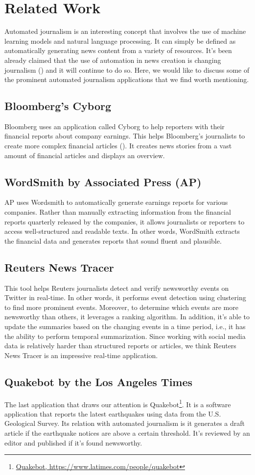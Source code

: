 \section{Related Work}\label{sec:related_work}
Automated journalism is an interesting concept that involves the use of machine learning models and natural language processing. It can simply be defined as automatically generating news content from a variety of resources. It's been already claimed that the use of automation in news creation is changing journalism (\cite{guzman2019prioritizing}) and it will continue to do so. Here, we would like to discuss some of the prominent automated journalism applications that we find worth mentioning.
\subsection{Bloomberg’s Cyborg}
Bloomberg uses an application called Cyborg to help reporters with their financial reports about company earnings. This helps Bloomberg's journalists to create more complex financial articles (\cite{micklethwait2018future}). It creates news stories from a vast amount of financial articles and displays an overview.
\subsection{WordSmith by Associated Press (AP)}
AP uses Wordsmith to automatically generate earnings reports for various companies. Rather than manually extracting information from the financial reports quarterly released by the companies, it allows journalists or reporters to access well-structured and readable texts. In other words, WordSmith extracts the financial data and generates reports that sound fluent and plausible.
\subsection{Reuters News Tracer}
This tool helps Reuters journalists detect and verify newsworthy events on Twitter in real-time. In other words, it performs event detection using clustering to find more prominent events. Moreover, to determine which events are more newsworthy than others, it leverages a ranking algorithm. In addition, it's able to update the summaries based on the changing events in a time period, i.e., it has the ability to perform temporal summarization. Since working with social media data is relatively harder than structured reports or articles, we think Reuters News Tracer is an impressive real-time application.
\subsection{Quakebot by the Los Angeles Times}
The last application that draws our attention is Quakebot\footnote{\href{https://www.latimes.com/people/quakebot}{Quakebot, https://www.latimes.com/people/quakebot}}. It is a software application that reports the latest earthquakes using data from the U.S. Geological Survey. Its relation with automated journalism is it generates a draft article if the earthquake notices are above a certain threshold. It's reviewed by an editor and published if it's found newsworthy.